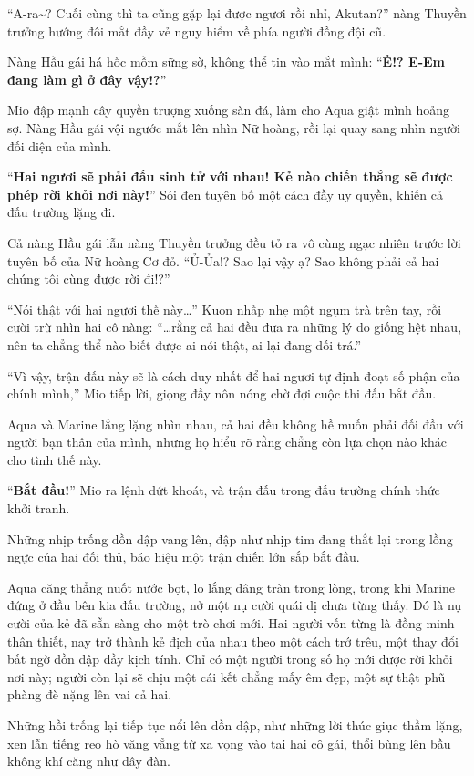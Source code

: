 \documentclass[../main.tex]{subfiles}
\begin{document}
``A-ra\~{}? Cuối cùng thì ta cũng gặp lại được ngươi rồi nhỉ, Akutan?'' nàng Thuyền trưởng hướng đôi mắt đầy vẻ nguy hiểm về phía người đồng đội cũ.

Nàng Hầu gái há hốc mồm sững sờ, không thể tin vào mắt mình: ``\textbf{Ẻ!? E-Em đang làm gì ở đây vậy!?}''

Mio đập mạnh cây quyền trượng xuống sàn đá, làm cho Aqua giật mình hoảng sợ. Nàng Hầu gái vội ngước mắt lên nhìn Nữ hoàng, rồi lại quay sang nhìn người đối diện của mình.

``\textbf{Hai ngươi sẽ phải đấu sinh tử với nhau! Kẻ nào chiến thắng sẽ được phép rời khỏi nơi này!}'' Sói đen tuyên bố một cách đầy uy quyền, khiến cả đấu trường lặng đi.

Cả nàng Hầu gái lẫn nàng Thuyền trưởng đều tỏ ra vô cùng ngạc nhiên trước lời tuyên bố của Nữ hoàng Cơ đỏ. ``Ủ-Ủa!? Sao lại vậy ạ? Sao không phải cả hai chúng tôi cùng được rời đi!?''

``Nói thật với hai ngươi thế này\dots'' Kuon nhấp nhẹ một ngụm trà trên tay, rồi cười trừ nhìn hai cô nàng: ``\dots rằng cả hai đều đưa ra những lý do giống hệt nhau, nên ta chẳng thể nào biết được ai nói thật, ai lại đang dối trá.''

``Vì vậy, trận đấu này sẽ là cách duy nhất để hai ngươi tự định đoạt số phận của chính mình,'' Mio tiếp lời, giọng đầy nôn nóng chờ đợi cuộc thi đấu bắt đầu.

Aqua và Marine lẳng lặng nhìn nhau, cả hai đều không hề muốn phải đối đầu với người bạn thân của mình, nhưng họ hiểu rõ rằng chẳng còn lựa chọn nào khác cho tình thế này.

``\textbf{Bắt đầu!}'' Mio ra lệnh dứt khoát, và trận đấu trong đấu trường chính thức khởi tranh.

Những nhịp trống dồn dập vang lên, đập như nhịp tim đang thắt lại trong lồng ngực của hai đối thủ, báo hiệu một trận chiến lớn sắp bắt đầu.

Aqua căng thẳng nuốt nước bọt, lo lắng dâng tràn trong lòng, trong khi Marine đứng ở đầu bên kia đấu trường, nở một nụ cười quái dị chưa từng thấy. Đó là nụ cười của kẻ đã sẵn sàng cho một trò chơi mới. Hai người vốn từng là đồng minh thân thiết, nay trở thành kẻ địch của nhau theo một cách trớ trêu, một thay đổi bất ngờ dồn dập đầy kịch tính. Chỉ có một người trong số họ mới được rời khỏi nơi này; người còn lại sẽ chịu một cái kết chẳng mấy êm đẹp, một sự thật phũ phàng đè nặng lên vai cả hai.

Những hồi trống lại tiếp tục nổi lên dồn dập, như những lời thúc giục thầm lặng, xen lẫn tiếng reo hò văng vẳng từ xa vọng vào tai hai cô gái, thổi bùng lên bầu không khí căng như dây đàn.
\end{document}

